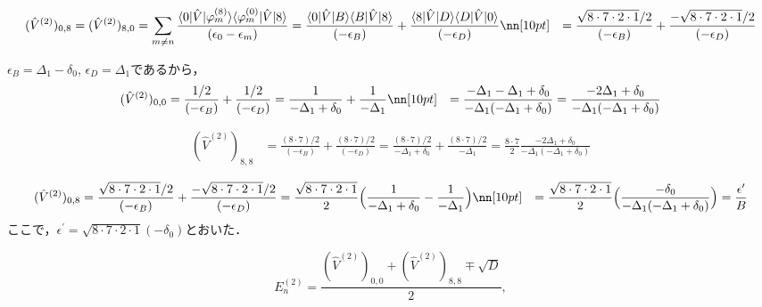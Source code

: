 \begin{align}
    (\hat{V}^{(2)})_{0,8}
    &=(\hat{V}^{(2)})_{8,0}
    =\sum_{m\neq n}
    \frac{\langle{0|\hat{V}|\varphi^{(8)}_m}\rangle
    \langle{\varphi^{(0)}_{m}|\hat{V}|8}\rangle}
    {(\epsilon_0-\epsilon_m)}
    =
    \frac{\langle{0|\hat{V}|B}\rangle
    \langle{B|\hat{V}|8}\rangle}
    {(-\epsilon_B)}
    +\frac{\langle{8|\hat{V}|D}\rangle
    \langle{D|\hat{V}|0}\rangle}
    {(-\epsilon_D)}\nn[10pt]
    & =
    \frac{\sqrt{8\cdot7\cdot2\cdot1}/2}
    {(-\epsilon_B)}
    +\frac{-\sqrt{8\cdot7\cdot2\cdot1}/2}
    {(-\epsilon_D)}
\end{align}





$\epsilon_B = \Delta_1 - \delta_0$, $\epsilon_D=\Delta_1$であるから，
\begin{align}
    (\hat{V}^{(2)})_{0,0}
    &
    =\frac{1 / 2}
    {(-\epsilon_B)}
    +\frac{1 / 2}
    {(-\epsilon_D)}
    =\frac{1}
    {-\Delta_1 + \delta_0}
    +\frac{1}
    {-\Delta_1}\nn[10pt]
    &
    =\frac{-\Delta_1-\Delta_1 + \delta_0}{-\Delta_1(-\Delta_1 + \delta_0)}
    =\frac{-2\Delta_1 + \delta_0}{-\Delta_1(-\Delta_1 + \delta_0)}
\end{align}


\begin{align}
    (\hat{V}^{(2)})_{8,8}
    &
    =\frac{(8\cdot7) / 2}
    {(-\epsilon_B)}
    +\frac{(8\cdot7) / 2}
    {(-\epsilon_D)}
    =\frac{(8\cdot7) / 2}
    {-\Delta_1 + \delta_0}
    +\frac{(8\cdot7) / 2}
    {-\Delta_1}
    =\frac{8\cdot7}{2}\frac{-2\Delta_1 + \delta_0}{-\Delta_1(-\Delta_1 + \delta_0)}
\end{align}




\begin{align}
    (\hat{V}^{(2)})_{0,8}
    & =
    \frac{\sqrt{8\cdot7\cdot2\cdot1}/2}
    {(-\epsilon_B)}
    +\frac{-\sqrt{8\cdot7\cdot2\cdot1}/2}
    {(-\epsilon_D)}
    =\frac{\sqrt{8\cdot7\cdot2\cdot1}}{2}
    \Bigl(
    \frac{1}
    {-\Delta_1 + \delta_0}
    -\frac{1}
    {-\Delta_1}
    \Bigr)
    \nn[10pt]
    &=\frac{\sqrt{8\cdot7\cdot2\cdot1}}{2}
    \Bigl(
    \frac{-\delta_0}
    {-\Delta_1(-\Delta_1 + \delta_0)}
    \Bigr)
    =\frac{\epsilon^{\prime}}{B}
\end{align}
ここで，$\epsilon^{\prime}=\sqrt{8\cdot7\cdot2\cdot1}(-\delta_0)$とおいた．

\begin{equation}
    E^{(2)}_n=\frac{
    (\hat{V}^{(2)})_{0,0} + (\hat{V}^{(2)})_{8,8}
    \mp \sqrt{D}
    }{2},
\end{equation}

